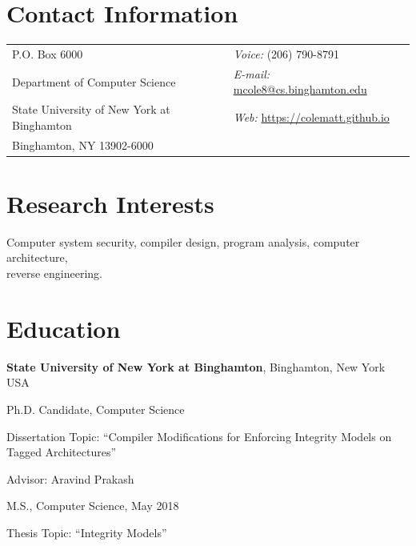 \documentclass[margin,line]{res}
\begin{document}

\begin{resume}

\section{\sc Contact Information}
\vspace{.05in}
\begin{tabular}{@{}p{3in}p{4in}}
P.O. Box 6000                               & {\it Voice:}  (206) 790-8791\\            
Department of Computer Science              & {\it E-mail:} \href{mailto:mcole8@cs.binghamton.edu}{mcole8@cs.binghamton.edu}\\         
State University of New York at Binghamton  & {\it Web:} \url{https://colematt.github.io}\\     
Binghamton, NY 13902-6000                   &
\end{tabular}

\section{\sc Research Interests}
Computer system security, compiler design, program analysis, computer architecture, \\ reverse engineering.

\section{\sc Education}
{\bf State University of New York at Binghamton}, Binghamton, New York USA\\
\vspace*{-.1in}
\begin{list1}
\item[] Ph.D. Candidate, Computer Science
\begin{list2}
\vspace*{.05in}
\item Dissertation Topic: ``Compiler Modifications for Enforcing Integrity Models on Tagged Architectures''
\item Advisor: Aravind Prakash
\end{list2}
\vspace*{.05in}
\item[] M.S., Computer Science,  May 2018
\begin{list2}
\vspace*{.05in}
\item Thesis Topic: ``Integrity Models''
\end{list2}
\end{list1}


\end{resume}
\end{document}
